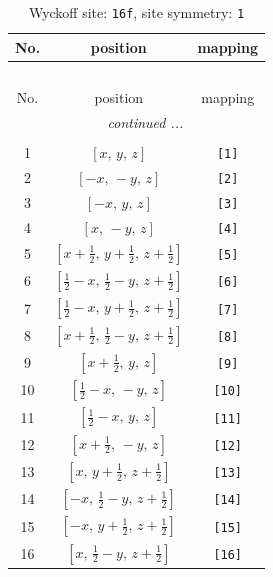 \documentclass[fleqn,8pt]{jsarticle}
\begin{document}
\begin{longtable}{ccc}
\caption{Wyckoff site: {\tt 16f}, site symmetry: {\tt 1}}
 \\
 \hline \hline
No. & position & mapping \\ \hline \endfirsthead

\multicolumn{2}{l}{\tablename\ \thetable{}} \\
 \hline \hline
No. & position & mapping \\ \hline \endhead

 \hline \hline
\multicolumn{2}{r}{\footnotesize\it continued ...} \\ \endfoot

 \hline \hline
\multicolumn{2}{r}{} \\ \endlastfoot

1 & $\left[ x,\, y,\, z \right]$ & {\tt [1]} \\ \hline
2 & $\left[ - x,\, - y,\, z \right]$ & {\tt [2]} \\ \hline
3 & $\left[ - x,\, y,\, z \right]$ & {\tt [3]} \\ \hline
4 & $\left[ x,\, - y,\, z \right]$ & {\tt [4]} \\ \hline
5 & $\left[ x + \frac{1}{2},\, y + \frac{1}{2},\, z + \frac{1}{2} \right]$ & {\tt [5]} \\ \hline
6 & $\left[ \frac{1}{2} - x,\, \frac{1}{2} - y,\, z + \frac{1}{2} \right]$ & {\tt [6]} \\ \hline
7 & $\left[ \frac{1}{2} - x,\, y + \frac{1}{2},\, z + \frac{1}{2} \right]$ & {\tt [7]} \\ \hline
8 & $\left[ x + \frac{1}{2},\, \frac{1}{2} - y,\, z + \frac{1}{2} \right]$ & {\tt [8]} \\ \hline
9 & $\left[ x + \frac{1}{2},\, y,\, z \right]$ & {\tt [9]} \\ \hline
10 & $\left[ \frac{1}{2} - x,\, - y,\, z \right]$ & {\tt [10]} \\ \hline
11 & $\left[ \frac{1}{2} - x,\, y,\, z \right]$ & {\tt [11]} \\ \hline
12 & $\left[ x + \frac{1}{2},\, - y,\, z \right]$ & {\tt [12]} \\ \hline
13 & $\left[ x,\, y + \frac{1}{2},\, z + \frac{1}{2} \right]$ & {\tt [13]} \\ \hline
14 & $\left[ - x,\, \frac{1}{2} - y,\, z + \frac{1}{2} \right]$ & {\tt [14]} \\ \hline
15 & $\left[ - x,\, y + \frac{1}{2},\, z + \frac{1}{2} \right]$ & {\tt [15]} \\ \hline
16 & $\left[ x,\, \frac{1}{2} - y,\, z + \frac{1}{2} \right]$ & {\tt [16]} \\
\end{longtable}
\end{document}
